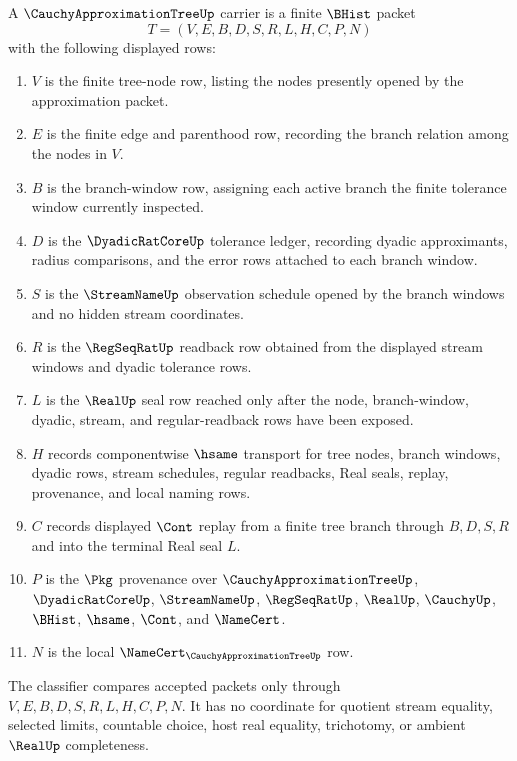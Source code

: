 \begin{definition}\label{def:cauchy-approximation-tree-carrier}
A $\CauchyApproximationTreeUp$ carrier is a finite $\BHist$ packet
$$
T=(V,E,B,D,S,R,L,H,C,P,N)
$$
with the following displayed rows:
\begin{enumerate}
\item $V$ is the finite tree-node row, listing the nodes presently opened by the approximation packet.
\item $E$ is the finite edge and parenthood row, recording the branch relation among the nodes in $V$.
\item $B$ is the branch-window row, assigning each active branch the finite tolerance window currently inspected.
\item $D$ is the $\DyadicRatCoreUp$ tolerance ledger, recording dyadic approximants, radius comparisons, and the error rows attached to each branch window.
\item $S$ is the $\StreamNameUp$ observation schedule opened by the branch windows and no hidden stream coordinates.
\item $R$ is the $\RegSeqRatUp$ readback row obtained from the displayed stream windows and dyadic tolerance rows.
\item $L$ is the $\RealUp$ seal row reached only after the node, branch-window, dyadic, stream, and regular-readback rows have been exposed.
\item $H$ records componentwise $\hsame$ transport for tree nodes, branch windows, dyadic rows, stream schedules, regular readbacks, Real seals, replay, provenance, and local naming rows.
\item $C$ records displayed $\Cont$ replay from a finite tree branch through $B,D,S,R$ and into the terminal Real seal $L$.
\item $P$ is the $\Pkg$ provenance over $\CauchyApproximationTreeUp$, $\DyadicRatCoreUp$, $\StreamNameUp$, $\RegSeqRatUp$, $\RealUp$, $\CauchyUp$, $\BHist$, $\hsame$, $\Cont$, and $\NameCert$.
\item $N$ is the local $\NameCert_{\CauchyApproximationTreeUp}$ row.
\end{enumerate}
The classifier compares accepted packets only through $V,E,B,D,S,R,L,H,C,P,N$. It has no coordinate for quotient stream equality, selected limits, countable choice, host real equality, trichotomy, or ambient $\RealUp$ completeness.
\end{definition}

